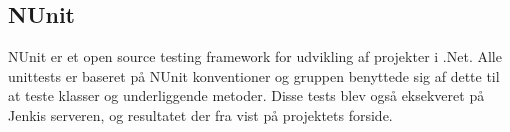 \subsection{NUnit}
NUnit er et open source testing framework for udvikling af projekter i .Net. Alle unittests er baseret på NUnit konventioner og gruppen benyttede sig af dette til at teste klasser og underliggende metoder. Disse tests blev også eksekveret på Jenkis serveren, og resultatet der fra vist på projektets forside.


%
%
%
